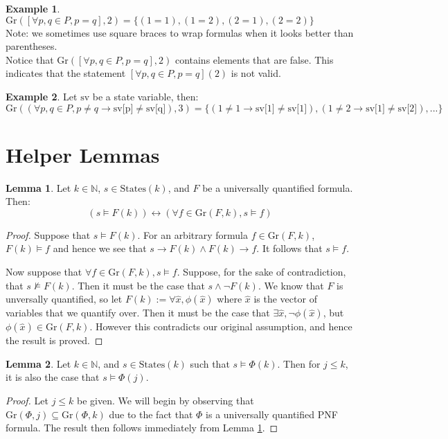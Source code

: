 \documentclass[12pt]{article}
\theoremstyle{definition}
\newtheorem{lemma}{Lemma}
\newtheorem{example}{Example}
\theoremstyle{remark}
\newcommand{\states}{\text{States}}
\newcommand{\gr}{\text{Gr}}
\begin{document}
\begin{example}
  $\gr([\forall p,q \in P, p=q],2) = \{(1=1),(1=2),(2=1),(2=2)\}$\\
  Note: we sometimes use square braces to wrap formulas when it looks better than parentheses.\\
  Notice that $\gr([\forall p,q \in P, p=q],2)$ contains elements that are false.  This indicates that the statement $[\forall p,q \in P, p=q](2)$ is not valid.
\end{example}
\begin{example}
  Let $\text{sv}$ be a state variable, then:
  $$\gr((\forall p,q \in P, p \neq q \rightarrow \text{sv[p]} \neq \text{sv[q]}),3) = \{(1 \neq 1 \rightarrow \text{sv[1]} \neq \text{sv[1]}),(1 \neq 2 \rightarrow \text{sv[1]} \neq \text{sv[2]}),...\}$$
\end{example}



\section{Helper Lemmas}

\begin{lemma}
  \label{lem:pnf-ground}
  Let $k \in \mathbb{N}$, $s \in \states(k)$, and $F$ be a universally quantified formula.  Then:
  $$(s \models F(k)) \leftrightarrow (\forall f \in \gr(F,k), s \models f)$$
\end{lemma}
\begin{proof}
  Suppose that $s \models F(k)$.  For an arbitrary formula $f \in \gr(F,k)$, $F(k) \models f$ and hence we see that $s \rightarrow F(k) \land F(k) \rightarrow f$.  It follows that $s \models f$.

  Now suppose that $\forall f \in \gr(F,k), s \models f$.  Suppose, for the sake of contradiction, that $s \not\models F(k)$.  Then it must be the case that $s \land \neg F(k)$.  We know that $F$ is unversally quantified, so let $F(k) := \forall \hat{x}, \phi(\hat{x})$ where $\hat{x}$ is the vector of variables that we quantify over.  Then it must be the case that $\exists \hat{x}, \neg \phi(\hat{x})$, but $\phi(\hat{x}) \in \gr(F,k)$.  However this contradicts our original assumption, and hence the result is proved.
\end{proof}

\begin{lemma}
  \label{lem:lt-sat}
  Let $k \in \mathbb{N}$, and $s \in \states(k)$ such that $s \models \Phi(k)$.  Then for $j \leq k$, it is also the case that $s \models \Phi(j)$.
\end{lemma}
\begin{proof}
  Let $j \leq k$ be given.  We will begin by observing that $\gr(\Phi,j) \subseteq \gr(\Phi,k)$ due to the fact that $\Phi$ is a universally quantified PNF formula.  The result then follows immediately from Lemma \ref{lem:pnf-ground}.  
\end{proof}
\end{document}
